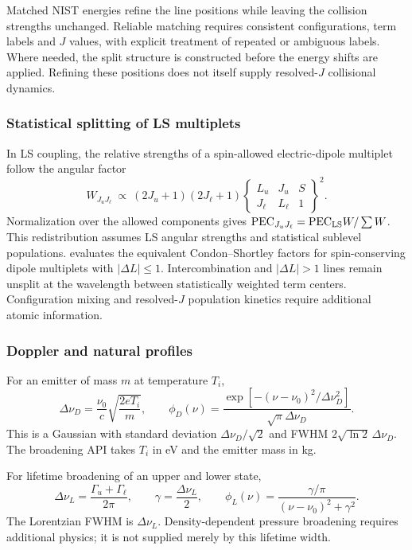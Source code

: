 \documentclass[11pt,a4paper]{article}
\newcommand{\routine}[1]{\textsf{\detokenize{#1}}}
\numberwithin{equation}{section}
\begin{document}
Matched NIST energies refine the line positions while leaving the
collision strengths unchanged. Reliable matching requires consistent
configurations, term labels and $J$ values, with explicit treatment
of repeated or ambiguous labels. Where needed, the split structure
is constructed before the energy shifts are applied. Refining these
positions does not itself supply resolved-$J$ collisional dynamics.

\subsubsection{Statistical splitting of LS multiplets}

In LS coupling, the relative strengths of a spin-allowed electric-dipole
multiplet follow the angular factor
\begin{equation}
 W_{J_uJ_\ell}\ \propto\ (2J_u+1)(2J_\ell+1)
 \begin{Bmatrix}L_u&J_u&S\\J_\ell&L_\ell&1\end{Bmatrix}^{\!2}.
\end{equation}
Normalization over the allowed components gives
$\mathrm{PEC}_{J_uJ_\ell}=\mathrm{PEC}_{\rm LS}W/\sum W$.
This redistribution assumes LS angular strengths and statistical
sublevel populations. \routine{split_pec_multiplet} evaluates the
equivalent Condon--Shortley factors for spin-conserving dipole
multiplets with $|\Delta L|\le1$. Intercombination and
$|\Delta L|>1$ lines remain unsplit at the wavelength between
statistically weighted term centers. Configuration mixing and
resolved-$J$ population kinetics require additional atomic information.

\subsubsection{Doppler and natural profiles}

For an emitter of mass $m$ at temperature $T_i$,
\begin{equation}
 \Delta\nu_D=\frac{\nu_0}{c}\sqrt{\frac{2eT_i}{m}},\qquad
 \phi_D(\nu)=\frac{\exp[-(\nu-\nu_0)^2/\Delta\nu_D^2]}
                   {\sqrt\pi\Delta\nu_D}.
\end{equation}
This is a Gaussian with standard deviation $\Delta\nu_D/\sqrt2$ and FWHM
$2\sqrt{\ln2}\,\Delta\nu_D$. The broadening API takes $T_i$ in eV and
the emitter mass in kg.

For lifetime broadening of an upper and lower state,
\begin{equation}
 \Delta\nu_L=\frac{\Gamma_u+\Gamma_\ell}{2\pi},\qquad
 \gamma=\frac{\Delta\nu_L}{2},\qquad
 \phi_L(\nu)=\frac{\gamma/\pi}{(\nu-\nu_0)^2+\gamma^2}.
\end{equation}
The Lorentzian FWHM is $\Delta\nu_L$. Density-dependent pressure broadening
requires additional physics; it is not supplied merely by this lifetime width.
\end{document}

